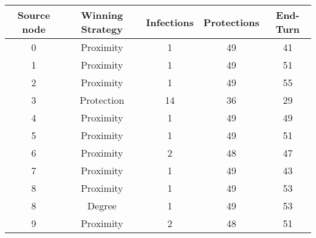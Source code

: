 \documentclass[results.tex]{subfiles}
\begin{document}
    \begin{center}
        \begin{tabular}{| c || c | c | c | c |}
            \hline
            {\bfseries Source node} & {\bfseries Winning Strategy} & {\bfseries Infections} & {\bfseries Protections}
            & {\bfseries End-Turn}
            \\  %
            \hline\hline
            0                       & Proximity                    & 1                      & 49                      & 41                   \\
            \hline
            1                       & Proximity                    & 1                      & 49                      & 51                   \\
            \hline
            2                       & Proximity                    & 1                      & 49                      & 55                   \\
            \hline
            3                       & Protection                   & 14                     & 36                      & 29                   \\
            \hline
            4                       & Proximity                    & 1                      & 49                      & 49                   \\
            \hline
            5                       & Proximity                    & 1                      & 49                      & 51                   \\
            \hline
            6                       & Proximity                    & 2                      & 48                      & 47                   \\
            \hline
            7                       & Proximity                    & 1                      & 49                      & 43                   \\
            \hline
            8                       & Proximity                    & 1                      & 49                      & 53                   \\
            \hline
            8                       & Degree                       & 1                      & 49                      & 53                   \\
            \hline
            9                       & Proximity                    & 2                      & 48                      & 51                   \\

\end{tabular}
\end{center}
\end{document}
